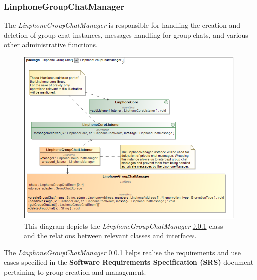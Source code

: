 \documentclass[11pt]{article}
\begin{document}
\subsubsection{LinphoneGroupChatManager}\label{ssc: linphonegroupchatmanager}
The \textit{LinphoneGroupChatManager} is responsible for handling the creation and deletion of group chat instances, messages handling for group chats, and various other administrative functions.
\begin{figure}[H]
	\centering
	\includegraphics[width=5in]{./images/class_chat_manager.png}
	\caption[LinphoneGroupChatManager Class Diagram]{This diagram depicts the \textit{LinphoneGroupChatManager} \ref{ssc: linphonegroupchatmanager} class and the relations between relevant classes and interfaces.}
	\label{cd-chat-manager}
\end{figure}
The \textit{LinphoneGroupChatManager} \ref{ssc: linphonegroupchatmanager} helps realise the requirements and use cases specified in the \textbf{Software Requirements Specification (SRS)} document pertaining to group creation and management.
\end{document}
